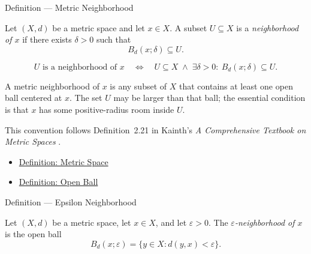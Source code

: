 \begin{definitionbox}{Definition --- Metric Neighborhood}
\begin{definition}
\label{def:metric-neighborhood}
Let \((X,d)\) be a metric space and let \(x\in X\).  A subset \(U\subseteq X\)
is a \emph{neighborhood of \(x\)} if there exists \(\delta>0\) such that
\[
  B_d(x;\delta)\subseteq U.
\]
\end{definition}
\end{definitionbox}

\begin{remark*}
\[
U\text{ is a neighborhood of }x
\quad\Longleftrightarrow\quad
U\subseteq X
\;\land\;
\exists\delta>0{:}\ B_d(x;\delta)\subseteq U.
\]
\end{remark*}

\begin{remark*}[Interpretation]
A metric neighborhood of \(x\) is any subset of \(X\) that contains at least
one open ball centered at \(x\).  The set \(U\) may be larger than that ball;
the essential condition is that \(x\) has some positive-radius room inside
\(U\).
\end{remark*}

\begin{remark*}
This convention follows Definition~2.21 in Kainth's
\emph{A Comprehensive Textbook on Metric Spaces}
\cite{KainthComprehensiveMetricSpaces2023}.
\end{remark*}

\begin{dependencies}
\begin{itemize}
  \item \hyperref[def:metric-space]{Definition: Metric Space}
  \item \hyperref[def:metric-open-ball]{Definition: Open Ball}
\end{itemize}
\end{dependencies}

\begin{definitionbox}{Definition --- Epsilon Neighborhood}
\begin{definition}
\label{def:metric-epsilon-neighborhood}
Let \((X,d)\) be a metric space, let \(x\in X\), and let
\(\varepsilon>0\).  The \emph{\(\varepsilon\)-neighborhood of \(x\)} is the
open ball
\[
  B_d(x;\varepsilon)
  =
  \{y\in X:d(y,x)<\varepsilon\}.
\]
\end{definition}
\end{definitionbox}

